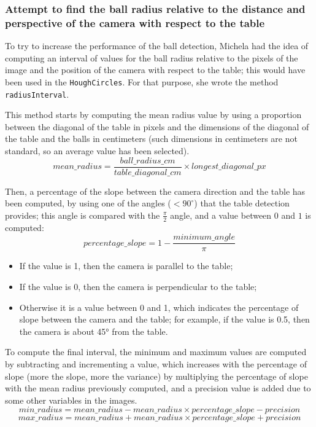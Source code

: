 \subsubsection{Attempt to find the ball radius relative to the distance and perspective of the camera with respect to the table}
To try to increase the performance of the ball detection, Michela had the idea of computing an interval of values for the ball radius relative to the pixels of the image and the position of the camera with respect to the table; this would have been used in the \texttt{HoughCircles}.
For that purpose, she wrote the method \texttt{radiusInterval}.

This method starts by computing the mean radius value by using a proportion between the diagonal of the table in pixels and the dimensions of the diagonal of the table and the balls in centimeters (such dimensions in centimeters are not standard, so an average value has been selected).
\begin{equation}
	mean\_radius = \frac{ball\_radius\_cm}{table\_diagonal\_cm} \times longest\_diagonal\_px
\end{equation}

Then, a percentage of the slope between the camera direction and the table has been computed, by using one of the angles ($<90^{\circ}$) that the table detection provides; this angle is compared with the $\frac{\pi}{2}$ angle, and a value between $0$ and $1$ is computed:
\begin{equation}
	percentage\_slope = 1 - \frac{minimum\_angle}{\pi}
\end{equation}

\begin{itemize}
	\item If the value is 1, then the camera is parallel to the table;
	\item If the value is 0, then the camera is perpendicular to the table;
	\item Otherwise it is a value between 0 and 1, which indicates the percentage of slope between the camera and the table; for example, if the value is 0.5, then the camera is about 45° from the table.
\end{itemize}

To compute the final interval, the minimum and maximum values are computed by subtracting and incrementing a value, which increases with the percentage of slope (more the slope, more the variance) by multiplying the percentage of slope with the mean radius previously computed, and a precision value is added due to some other variables in the images.
\begin{equation}
	min\_radius = mean\_radius - mean\_radius \times percentage\_slope - precision
\end{equation}
\begin{equation}
	max\_radius = mean\_radius + mean\_radius \times percentage\_slope + precision
\end{equation}

